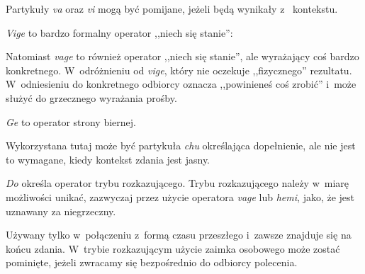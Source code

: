 \begin{spacing}{1.1}



Partykuły \emph{va} oraz \emph{vi} mogą być pomijane, jeżeli będą wynikały z~
kontekstu.

\emph{Vige} to bardzo formalny operator ,,niech się stanie'':


Natomiast \emph{vage} to również operator ,,niech się stanie'', ale wyrażający coś
bardzo konkretnego. W~odróżnieniu od \emph{vige}, który nie oczekuje 
,,fizycznego'' rezultatu. W~odniesieniu do konkretnego odbiorcy oznacza 
,,powinieneś coś zrobić'' i~może służyć do grzecznego wyrażania prośby.




\emph{Ge} to operator strony biernej.


Wykorzystana tutaj może być partykuła \emph{chu} określająca dopełnienie, ale 
nie jest to wymagane, kiedy kontekst zdania jest jasny.


\skipline

\emph{Do} określa operator trybu rozkazującego. Trybu rozkazującego należy 
w~miarę możliwości unikać, zazwyczaj przez użycie operatora \emph{vage} lub 
\emph{hemi}, jako, że jest uznawany za niegrzeczny.

Używany tylko w~połączeniu z~formą czasu przeszłego i~zawsze 
znajduje się na końcu zdania. W~trybie rozkazującym użycie zaimka osobowego 
może zostać pominięte, jeżeli zwracamy się bezpośrednio do odbiorcy polecenia.




\end{spacing}
